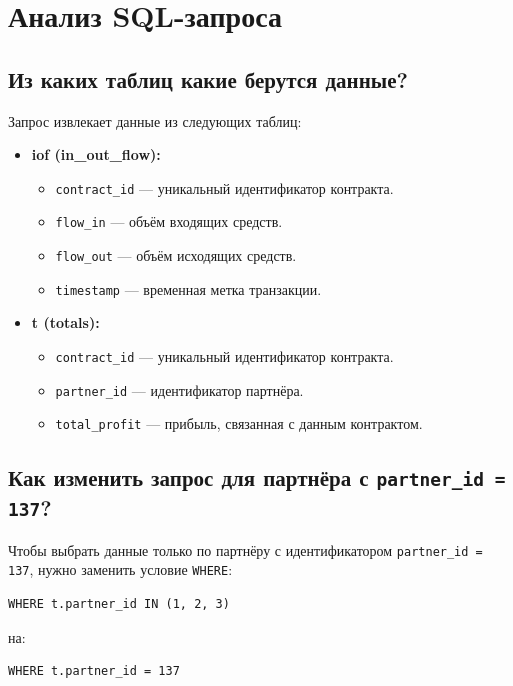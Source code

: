 \documentclass[12pt]{article}
\theoremstyle{indented}
\theoremstyle{definition}
\theoremstyle{remark}
\begin{document}
\newpage

\section{Анализ SQL-запроса}

\subsection{Из каких таблиц какие берутся данные?}

Запрос извлекает данные из следующих таблиц:
\begin{itemize}
    \item \textbf{iof (in\_out\_flow):}
    \begin{itemize}
        \item \texttt{contract\_id} — уникальный идентификатор контракта.
        \item \texttt{flow\_in} — объём входящих средств.
        \item \texttt{flow\_out} — объём исходящих средств.
        \item \texttt{timestamp} — временная метка транзакции.
    \end{itemize}
    \item \textbf{t (totals):}
    \begin{itemize}
        \item \texttt{contract\_id} — уникальный идентификатор контракта.
        \item \texttt{partner\_id} — идентификатор партнёра.
        \item \texttt{total\_profit} — прибыль, связанная с данным контрактом.
    \end{itemize}
\end{itemize}


\subsection{Как изменить запрос для партнёра с \texttt{partner\_id = 137}?}

Чтобы выбрать данные только по партнёру с идентификатором \texttt{partner\_id = 137}, нужно заменить условие \texttt{WHERE}:

\begin{verbatim}
WHERE t.partner_id IN (1, 2, 3)
\end{verbatim}

на:

\begin{verbatim}
WHERE t.partner_id = 137
\end{verbatim}
\end{document}
